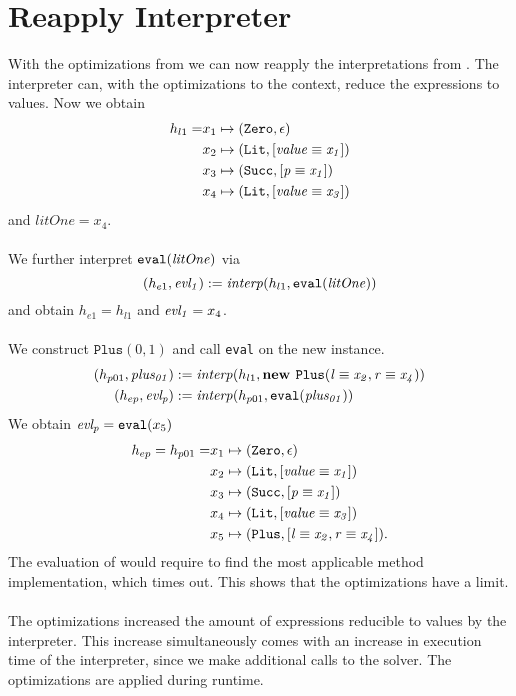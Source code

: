 \section{Reapply Interpreter} %
With the optimizations from 
we can now reapply the interpretations from .
The interpreter can, with the optimizations to the context,
reduce the expressions to values.
Now we obtain
\begin{align*}
h_{l1} = &x_1 \mapsto (\texttt{Zero}, \epsilon)\\
         &x_2 \mapsto (\texttt{Lit}, [\mathit{\mathit{value}} \equiv \mathit{x_1}])\\
         &x_3 \mapsto (\texttt{Succ}, [\mathit{\mathit{p}} \equiv \mathit{x_1}])\\
         &x_4 \mapsto (\texttt{Lit}, [\mathit{\mathit{value}} \equiv \mathit{x_3}])
\end{align*}
and $litOne = x_4$.\\
\\
We further interpret $\texttt{eval}(\mathit{litOne})$ via
\[
(h_{e1}, \mathit{evl_1}) := \mathit{interp}(h_{l1}, \texttt{eval}(\mathit{litOne}))
\]
and obtain $h_{e1} = h_{l1}$ and $\mathit{evl_1} = x_4$.\\
\\
We construct $\texttt{Plus}(0, 1)$ and call \texttt{eval}
on the new instance.
\begin{align*}
(h_{p01}, \mathit{plus_{01}}) &:= \mathit{interp}(h_{l1}, \textbf{new } \mathit{\texttt{Plus}}(\mathit{\mathit{l} \equiv \mathit{x_2}, \mathit{r} \equiv \mathit{x_4}}))\\
(h_{ep}, \mathit{evl_p}) & := \mathit{interp}(h_{p01}, \texttt{eval}(\mathit{plus_{01}}))
\end{align*}
We obtain $\mathit{evl_p} = \texttt{eval}(x_5)$
\begin{align*}
h_{ep} = h_{p01} = &x_1 \mapsto (\texttt{Zero}, \epsilon)\\
                   &x_2 \mapsto (\texttt{Lit}, [\mathit{\mathit{value}} \equiv \mathit{x_1}])\\
                   &x_3 \mapsto (\texttt{Succ}, [\mathit{\mathit{p}} \equiv \mathit{x_1}])\\
                   &x_4 \mapsto (\texttt{Lit}, [\mathit{\mathit{value}} \equiv \mathit{x_3}])\\
                   &x_5 \mapsto (\texttt{Plus}, [\mathit{l} \equiv \mathit{x_2}, \mathit{r} \equiv \mathit{x_4}]).
\end{align*}
%
The evaluation of  would require
to find the most applicable method implementation,
which times out.
This shows that the optimizations have a limit.\\
\\
The optimizations increased the amount of expressions
reducible to values by the interpreter.
This increase simultaneously comes with an increase
in execution time of the interpreter,
since we make additional calls to the solver.
The optimizations are applied during runtime.

